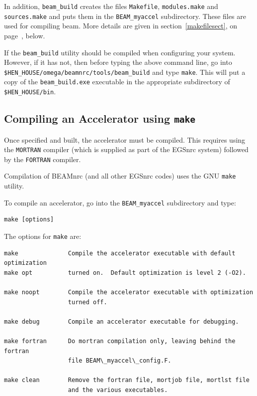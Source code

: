 \documentclass[12pt,twoside]{article}
\begin{document}
In addition, {\tt beam\_build} creates
the files {\tt Makefile}, {\tt modules.make} and {\tt sources.make} and
puts them in the {\tt BEAM\_myaccel} subdirectory.  These files
are used for compiling beam.
More details
are given in section~\ref{makefilesect}, on
page~\pageref{makefilesect}, below.

If the {\tt beam\_build} utility should be compiled when configuring your
system.  However, if it has not, then before typing the above command line, go into
{\tt \$HEN\_HOUSE/omega/beamnrc/tools/beam\_build} and type {\tt make}.  This
will put a copy of the {\tt beam\_build.exe} executable in the appropriate
subdirectory of {\tt \$HEN\_HOUSE/bin}.

\subsection{Compiling an Accelerator using {\tt make}}
\label{ca}

Once specified and built, the accelerator must be compiled. This
requires using the \verb+MORTRAN+ compiler (which is supplied as part of
the EGSnrc system) followed by the \verb+FORTRAN+ compiler.

Compilation of BEAMnrc (and all other EGSnrc codes) uses the GNU
{\tt make} utility.

To compile an accelerator, go into the {\tt BEAM\_myaccel}
subdirectory and type:
\begin{verbatim}
make [options]
\end{verbatim}

The options for {\tt make} are:
\begin{verbatim}
make              Compile the accelerator executable with default optimization
make opt          turned on.  Default optimization is level 2 (-O2).

make noopt        Compile the accelerator executable with optimization
                  turned off.

make debug        Compile an accelerator executable for debugging.

make fortran      Do mortran compilation only, leaving behind the fortran
                  file BEAM\_myaccel\_config.F.

make clean        Remove the fortran file, mortjob file, mortlst file
                  and the various executables.
\end{verbatim}
\end{document}
